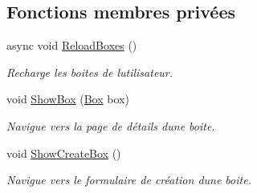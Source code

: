 \subsection*{Fonctions membres privées}
\begin{DoxyCompactItemize}
\item 
async void \hyperlink{class_boxes_1_1_view_models_1_1_my_boxes_view_model_ab7b3cd98fa29390b1b517491e754f3cd}{Reload\+Boxes} ()
\begin{DoxyCompactList}\small\item\em Recharge les boites de l\textquotesingle{}utilisateur. \end{DoxyCompactList}\item 
void \hyperlink{class_boxes_1_1_view_models_1_1_my_boxes_view_model_ae4331f8ca8b0c427ef8d43d198ce4f1a}{Show\+Box} (\hyperlink{class_boxes_1_1_models_1_1_box}{Box} box)
\begin{DoxyCompactList}\small\item\em Navigue vers la page de détails d\textquotesingle{}une boite. \end{DoxyCompactList}\item 
void \hyperlink{class_boxes_1_1_view_models_1_1_my_boxes_view_model_a8cdee0a2a3a7d5be62dd4c56af5339d1}{Show\+Create\+Box} ()
\begin{DoxyCompactList}\small\item\em Navigue vers le formulaire de création d\textquotesingle{}une boite. \end{DoxyCompactList}\end{DoxyCompactItemize}
